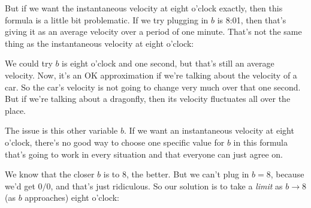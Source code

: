 \documentclass[pdftex, brazil, 12pt, twoside]{article}
\begin{document}
But if we want the instantaneous velocity at eight o'clock
exactly, then this formula is a little bit problematic.
If we try plugging in $b$ is 8:01, then that's
giving it as an average velocity over a period of one minute.
That's not the same thing as the instantaneous velocity
at eight o'clock:

\begin{figure}[H]
  \begin{center}
  \end{center}
\end{figure}

We could try $b$ is eight o'clock and one second,
but that's still an average velocity.
Now, it's an OK approximation if we're talking
about the velocity of a car.
So the car's velocity is not going
to change very much over that one second.
But if we're talking about a dragonfly,
then its velocity fluctuates all over the place.

The issue is this other variable $b$.
If we want an instantaneous velocity at eight o'clock,
there's no good way to choose one specific value
for $b$ in this formula that's going
to work in every situation and that everyone can just
agree on.

We know that the closer $b$ is to 8, the better.
But we can't plug in $b = 8$,
because we'd get $0/0$, and that's just ridiculous.
So our solution is to take a \emph{limit}
as $b \to 8$ (as $b$ approaches) eight o'clock:

\begin{figure}[H]
  \begin{center}
  \end{center}
\end{figure}
\end{document}
